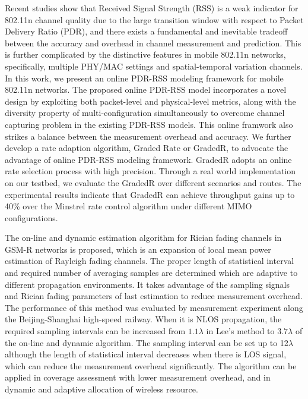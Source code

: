 \begin{englishabstract}

Recent studies show that Received Signal Strength (RSS) is a weak indicator for 802.11n channel quality due to the large transition window with respect to Packet Delivery Ratio (PDR), and there exists a fundamental and inevitable tradeoff between the accuracy and overhead in channel measurement and prediction. This is further complicated by the distinctive features in mobile 802.11n networks, specifically, multiple PHY/MAC settings and spatial-temporal variation channels. In this work, we present an online PDR-RSS modeling framework for mobile 802.11n networks. The proposed online PDR-RSS model incorporates a novel design by exploiting both packet-level and physical-level metrics, along with the diversity property of multi-configuration simultaneously to overcome channel capturing problem in the existing PDR-RSS models. This online framwork also strikes a balance between the measurement overhead and accuracy. We further develop a rate adaption algorithm, Graded Rate or GradedR, to advocate the advantage of  online PDR-RSS modeling framework. GradedR adopts an online rate selection process with high precision. Through a real world implementation on our testbed, we evaluate the GradedR over different scenarios and routes. The experimental results indicate that GradedR can achieve throughput gains up to 40\% over the Minstrel rate control algorithm under different MIMO configurations.

The on-line and dynamic estimation algorithm for Rician fading channels in GSM-R networks is proposed, which is an expansion of local mean power estimation of Rayleigh fading channels. The proper length of statistical interval and required number of averaging samples are determined which are adaptive to different propagation environments. It takes advantage of the sampling signals and Rician fading parameters of last estimation to reduce measurement overhead. The performance of this method was evaluated by measurement experiment along the Beijing-Shanghai high-speed railway. When it is NLOS propagation, the required sampling intervals can be increased from $1.1\lambda$ in Lee's method to $3.7\lambda$ of the on-line and dynamic algorithm. The sampling interval can be set up to 12$\lambda$ although the length of statistical interval decreases when there is LOS signal, which can reduce the measurement overhead significantly. The algorithm can be applied in coverage assessment with lower measurement overhead, and in dynamic and adaptive allocation of wireless resource.

\end{englishabstract}
